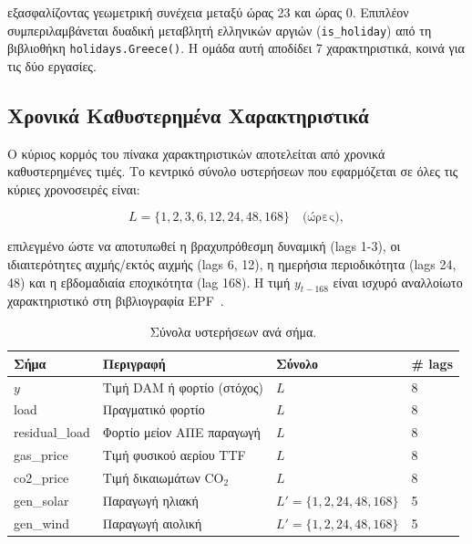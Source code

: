 εξασφαλίζοντας γεωμετρική συνέχεια μεταξύ ώρας 23 και ώρας 0. Επιπλέον
συμπεριλαμβάνεται δυαδική μεταβλητή ελληνικών αργιών (\texttt{is\_holiday}) από τη
βιβλιοθήκη \texttt{holidays.Greece()}. Η ομάδα αυτή αποδίδει 7 χαρακτηριστικά, κοινά
για τις δύο εργασίες.


\subsection{Χρονικά Καθυστερημένα Χαρακτηριστικά}
\label{sec:lag_features}

Ο κύριος κορμός του πίνακα χαρακτηριστικών αποτελείται από χρονικά καθυστερημένες τιμές.
Το κεντρικό σύνολο υστερήσεων που εφαρμόζεται σε όλες τις κύριες χρονοσειρές είναι:

\begin{equation}
  L = \{1, 2, 3, 6, 12, 24, 48, 168\} \quad \text{(ώρες)},
  \label{eq:lag_set}
\end{equation}

επιλεγμένο ώστε να αποτυπωθεί η βραχυπρόθεσμη δυναμική (lags 1-3), οι ιδιαιτερότητες
αιχμής/εκτός αιχμής (lags 6, 12), η ημερήσια περιοδικότητα (lags 24, 48) και η εβδομαδιαία
εποχικότητα (lag 168). Η τιμή $y_{t-168}$ είναι ισχυρό αναλλοίωτο χαρακτηριστικό στη
βιβλιογραφία EPF~\cite{uniejewski2019}.

\begin{table}[htbp]
\centering
\caption{Σύνολα υστερήσεων ανά σήμα.}
\label{tab:lag_sets}
\begin{tabular}{llll}
\toprule
Σήμα & Περιγραφή & Σύνολο & \# lags \\
\midrule
$y$            & Τιμή DAM ή φορτίο (στόχος)   & $L$                      & 8 \\
load           & Πραγματικό φορτίο             & $L$                      & 8 \\
residual\_load & Φορτίο μείον ΑΠΕ παραγωγή     & $L$                      & 8 \\
gas\_price     & Τιμή φυσικού αερίου TTF        & $L$                      & 8 \\
co2\_price     & Τιμή δικαιωμάτων CO$_2$       & $L$                      & 8 \\
gen\_solar     & Παραγωγή ηλιακή               & $L' = \{1,2,24,48,168\}$ & 5 \\
gen\_wind      & Παραγωγή αιολική              & $L' = \{1,2,24,48,168\}$ & 5 \\
\bottomrule
\end{tabular}
\end{table}

